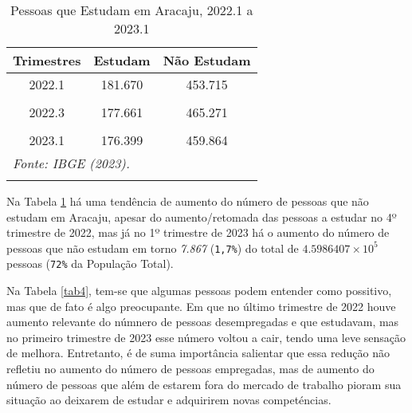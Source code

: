 \documentclass[preprint, 3p,
authoryear]{elsarticle} %
\begin{document}
\begin{longtable}[t]{ccc}
\caption{\label{tab:tab3}\label{tab3}Pessoas que Estudam em Aracaju, 2022.1 a 2023.1}\\
\toprule
Trimestres & Estudam & Não Estudam\\
\midrule
2022.1 & 181.670 & 453.715\\
\cellcolor[HTML]{DCDCDC}{2022.2} & \cellcolor[HTML]{DCDCDC}{180.855} & \cellcolor[HTML]{DCDCDC}{460.077}\\
2022.3 & 177.661 & 465.271\\
\cellcolor[HTML]{DCDCDC}{2022.4} & \cellcolor[HTML]{DCDCDC}{187.619} & \cellcolor[HTML]{DCDCDC}{451.997}\\
2023.1 & 176.399 & 459.864\\
\bottomrule
\multicolumn{3}{l}{\rule{0pt}{1em}\textit{Fonte: IBGE (2023).}}\\
\multicolumn{3}{l}{\rule{0pt}{1em}}\\
\end{longtable}
\endgroup{}

Na Tabela \ref{tab3} há uma tendência de aumento do número de pessoas
que não estudam em Aracaju, apesar do aumento/retomada das pessoas a
estudar no 4º trimestre de 2022, mas já no 1º trimestre de 2023 há o
aumento do número de pessoas que não estudam em torno \emph{7.867}
(\texttt{1,7\%}) do total de \ensuremath{4.5986407\times 10^{5}} pessoas
(\texttt{72\%} da População Total).

Na Tabela \ref{tab4}, tem-se que algumas pessoas podem entender como
possitivo, mas que de fato é algo preocupante. Em que no último
trimestre de 2022 houve aumento relevante do númnero de pessoas
desempregadas e que estudavam, mas no primeiro trimestre de 2023 esse
número voltou a cair, tendo uma leve sensação de melhora. Entretanto, é
de suma importância salientar que essa redução não refletiu no aumento
do número de pessoas empregadas, mas de aumento do número de pessoas que
além de estarem fora do mercado de trabalho pioram sua situação ao
deixarem de estudar e adquirirem novas competéncias.

\begingroup\fontsize{9}{11}\selectfont
\end{document}

